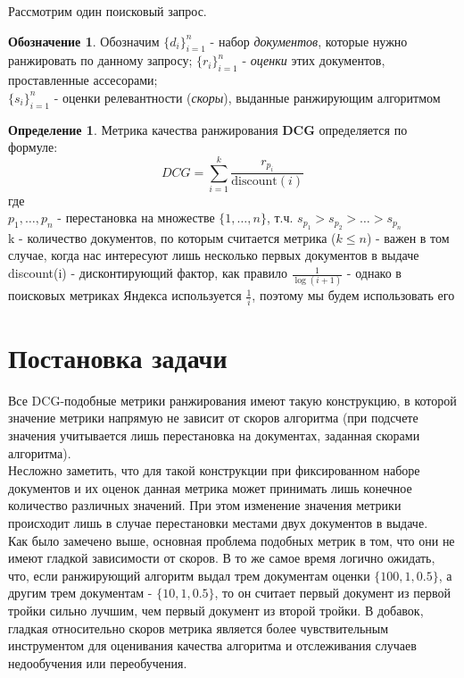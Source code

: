 \documentclass[14pt,a4paper]{amsart}
\theoremstyle{definition}
\newtheorem{definition}{Определение}[section]
\theoremstyle{definition}
\newtheorem{designation}{Обозначение}[section]
\newcommand{\Sum}{\sum\limits}
\renewcommand\i{\textit}
\renewcommand\t{\text}
\renewcommand\b{\textbf}
\begin{document}
Рассмотрим один поисковый запрос.

\begin{designation}
Обозначим $\{d_i\}_{i=1}^n$ - набор \i{документов}, которые нужно ранжировать по данному запросу; 
$\{r_i\}_{i=1}^n$ - \i{оценки} этих документов, проставленные ассесорами; \\
$\{s_i\}_{i=1}^n$ - оценки релевантности (\i{скоры}), выданные ранжирующим алгоритмом
\end{designation}

\begin{definition}
Метрика качества ранжирования \b{DCG} определяется по формуле:
$$DCG = \Sum_{i=1}^k \frac{r_{p_i}}{\t{discount}(i)}$$
где \\
$p_1,\dots,p_n$ - перестановка на множестве $\{1,\dots,n\}$, т.ч. ${s_{p_1} > s_{p_2} > \dots > s_{p_n}}$ \\
k - количество документов, по которым считается метрика ($k \le n$) - важен в том случае, когда нас интересуют лишь несколько первых документов в выдаче \\
discount(i) - дисконтирующий фактор, как правило $\frac{1}{\log(i + 1)}$ - однако в поисковых метриках Яндекса используется $\frac{1}{i}$, поэтому мы будем использовать его \\
\end{definition}

\newpage
\section{Постановка задачи}

Все DCG-подобные метрики ранжирования имеют такую конструкцию, в которой значение метрики напрямую не зависит от скоров алгоритма (при подсчете значения учитывается лишь перестановка на документах, заданная скорами алгоритма).\\

Несложно заметить, что для такой конструкции при фиксированном наборе документов и их оценок данная метрика может принимать лишь конечное количество различных значений. При этом изменение значения метрики происходит лишь в случае перестановки местами двух документов в выдаче.\\

Как было замечено выше, основная проблема подобных метрик в том, что они не имеют гладкой зависимости от скоров. В то же самое время логично ожидать, что, если ранжирующий алгоритм выдал трем документам оценки $\{100, 1, 0.5\}$, а другим трем документам - $\{10, 1, 0.5\}$, то он считает первый документ из первой тройки сильно лучшим, чем первый документ из второй тройки. В добавок, гладкая относительно скоров метрика является более чувствительным инструментом для оценивания качества алгоритма и отслеживания случаев недообучения или переобучения.\\
\end{document}
